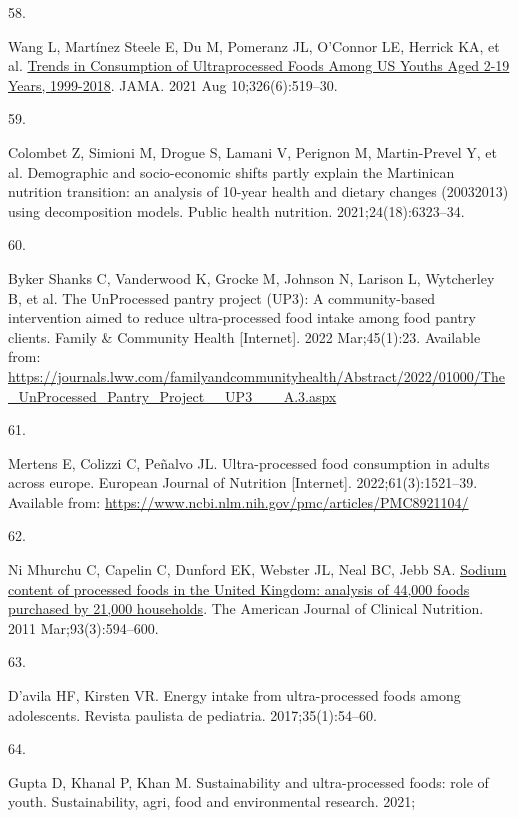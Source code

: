 \documentclass[
]{article}
\newlength{\cslhangindent}
\newlength{\csllabelwidth}
\newlength{\cslentryspacingunit} %
\newenvironment{CSLReferences}[2] %
 {%
  \setlength{\parindent}{0pt}
  \ifodd #1
  \let\oldpar\par
  \def\par{\hangindent=\cslhangindent\oldpar}
  \fi
  \setlength{\parskip}{#2\cslentryspacingunit}
 }%
 {}
\newcommand{\CSLLeftMargin}[1]{\parbox[t]{\csllabelwidth}{#1}}
\newcommand{\CSLRightInline}[1]{\parbox[t]{\linewidth - \csllabelwidth}{#1}\break}
\begin{document}
\begin{CSLReferences}{0}{0}
\leavevmode{}%
\CSLLeftMargin{58. }%
\CSLRightInline{Wang L, Martínez Steele E, Du M, Pomeranz JL, O'Connor
LE, Herrick KA, et al.
\href{https://doi.org/10.1001/jama.2021.10238}{Trends in Consumption of
Ultraprocessed Foods Among US Youths Aged 2-19 Years, 1999-2018}. JAMA.
2021 Aug 10;326(6):519--30. }

\leavevmode{}%
\CSLLeftMargin{59. }%
\CSLRightInline{Colombet Z, Simioni M, Drogue S, Lamani V, Perignon M,
Martin-Prevel Y, et al. Demographic and socio-economic shifts partly
explain the Martinican nutrition transition: an analysis of 10-year
health and dietary changes (2003{\textendash}2013) using decomposition
models. Public health nutrition. 2021;24(18):6323--34. }

\leavevmode{}%
\CSLLeftMargin{60. }%
\CSLRightInline{Byker Shanks C, Vanderwood K, Grocke M, Johnson N,
Larison L, Wytcherley B, et al. The UnProcessed pantry project (UP3): A
community-based intervention aimed to reduce ultra-processed food intake
among food pantry clients. Family \& Community Health {[}Internet{]}.
2022 Mar;45(1):23. Available from:
\url{https://journals.lww.com/familyandcommunityhealth/Abstract/2022/01000/The_UnProcessed_Pantry_Project__UP3___A.3.aspx}}

\leavevmode{}%
\CSLLeftMargin{61. }%
\CSLRightInline{Mertens E, Colizzi C, Peñalvo JL. Ultra-processed food
consumption in adults across europe. European Journal of Nutrition
{[}Internet{]}. 2022;61(3):1521--39. Available from:
\url{https://www.ncbi.nlm.nih.gov/pmc/articles/PMC8921104/}}

\leavevmode{}%
\CSLLeftMargin{62. }%
\CSLRightInline{Ni Mhurchu C, Capelin C, Dunford EK, Webster JL, Neal
BC, Jebb SA. \href{https://doi.org/10.3945/ajcn.110.004481}{Sodium
content of processed foods in the United Kingdom: analysis of 44,000
foods purchased by 21,000 households}. The American Journal of Clinical
Nutrition. 2011 Mar;93(3):594--600. }

\leavevmode{}%
\CSLLeftMargin{63. }%
\CSLRightInline{D'avila HF, Kirsten VR. Energy intake from
ultra-processed foods among adolescents. Revista paulista de pediatria.
2017;35(1):54--60. }

\leavevmode{}%
\CSLLeftMargin{64. }%
\CSLRightInline{Gupta D, Khanal P, Khan M. Sustainability and
ultra-processed foods: role of youth. Sustainability, agri, food and
environmental research. 2021; }


\end{CSLReferences}
\end{document}
